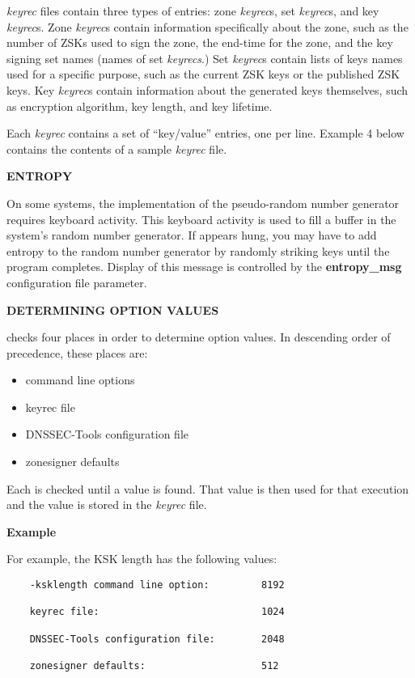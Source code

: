 {\it keyrec} files contain three types of entries:  zone {\it keyrec}s, set
{\it keyrec}s, and key {\it keyrec}s.  Zone {\it keyrec}s contain information
specifically about the zone, such as the number of ZSKs used to sign the zone,
the end-time for the zone, and the key signing set names (names of set {\it
keyrecs}.)  Set {\it keyrec}s contain lists of keys names used for a specific
purpose, such as the current ZSK keys or the published ZSK keys.  Key {\it
keyrec}s contain information about the generated keys themselves, such as
encryption algorithm, key length, and key lifetime.

Each {\it keyrec} contains a set of ``key/value'' entries, one per line.
Example 4 below contains the contents of a sample {\it keyrec} file.

{\bf ENTROPY}

On some systems, the implementation of the pseudo-random number generator
requires keyboard activity.  This keyboard activity is used to fill a buffer
in the system's random number generator.  If  appears hung,
you may have to add entropy to the random number generator by randomly
striking keys until the program completes.  Display of this message is
controlled by the {\bf entropy\_msg} configuration file parameter.

{\bf DETERMINING OPTION VALUES}

 checks four places in order to determine option values.  
In descending order of precedence, these places are:

\begin{itemize}
\item command line options
\item keyrec file
\item DNSSEC-Tools configuration file
\item zonesigner defaults
\end{itemize}

Each is checked until a value is found.  That value is then used for that
 execution and the value is stored in the {\it keyrec} file.

{\bf Example}

For example, the KSK length has the following values:

\begin{verbatim}
    -ksklength command line option:         8192

    keyrec file:                            1024

    DNSSEC-Tools configuration file:        2048

    zonesigner defaults:                    512
\end{verbatim}

